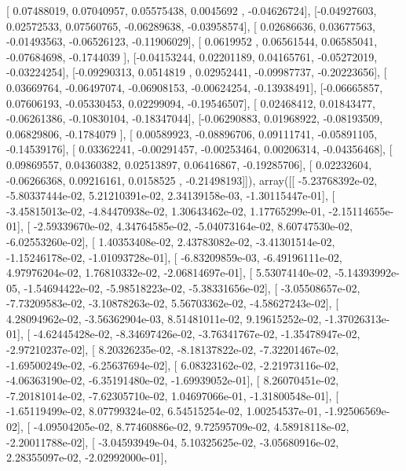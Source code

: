 \documentclass{article}
\begin{document}
       [ 0.07488019,  0.07040957,  0.05575438,  0.0045692 , -0.04626724],
       [-0.04927603,  0.02572533,  0.07560765, -0.06289638, -0.03958574],
       [ 0.02686636,  0.03677563, -0.01493563, -0.06526123, -0.11906029],
       [ 0.0619952 ,  0.06561544,  0.06585041, -0.07684698, -0.1744039 ],
       [-0.04153244,  0.02201189,  0.04165761, -0.05272019, -0.03224254],
       [-0.09290313,  0.0514819 ,  0.02952441, -0.09987737, -0.20223656],
       [ 0.03669764, -0.06497074, -0.06908153, -0.00624254, -0.13938491],
       [-0.06665857,  0.07606193, -0.05330453,  0.02299094, -0.19546507],
       [ 0.02468412,  0.01843477, -0.06261386, -0.10830104, -0.18347044],
       [-0.06290883,  0.01968922, -0.08193509,  0.06829806, -0.1784079 ],
       [ 0.00589923, -0.08896706,  0.09111741, -0.05891105, -0.14539176],
       [ 0.03362241, -0.00291457, -0.00253464,  0.00206314, -0.04356468],
       [ 0.09869557,  0.04360382,  0.02513897,  0.06416867, -0.19285706],
       [ 0.02232604, -0.06266368,  0.09216161,  0.0158525 , -0.21498193]]), array([[ -5.23768392e-02,  -5.80337444e-02,   5.21210391e-02,
          2.34139158e-03,  -1.30115447e-01],
       [ -3.45815013e-02,  -4.84470938e-02,   1.30643462e-02,
          1.17765299e-01,  -2.15114655e-01],
       [ -2.59339670e-02,   4.34764585e-02,  -5.04073164e-02,
          8.60747530e-02,  -6.02553260e-02],
       [  1.40353408e-02,   2.43783082e-02,  -3.41301514e-02,
         -1.15246178e-02,  -1.01093728e-01],
       [ -6.83209859e-03,  -6.49196111e-02,   4.97976204e-02,
          1.76810332e-02,  -2.06814697e-01],
       [  5.53074140e-02,  -5.14393992e-05,  -1.54694422e-02,
         -5.98518223e-02,  -5.38331656e-02],
       [ -3.05508657e-02,  -7.73209583e-02,  -3.10878263e-02,
          5.56703362e-02,  -4.58627243e-02],
       [  4.28094962e-02,  -3.56362904e-03,   8.51481011e-02,
          9.19615252e-02,  -1.37026313e-01],
       [ -4.62445428e-02,  -8.34697426e-02,  -3.76341767e-02,
         -1.35478947e-02,  -2.97210237e-02],
       [  8.20326235e-02,  -8.18137822e-02,  -7.32201467e-02,
         -1.69500249e-02,  -6.25637694e-02],
       [  6.08323162e-02,  -2.21973116e-02,  -4.06363190e-02,
         -6.35191480e-02,  -1.69939052e-01],
       [  8.26070451e-02,  -7.20181014e-02,  -7.62305710e-02,
          1.04697066e-01,  -1.31800548e-01],
       [ -1.65119499e-02,   8.07799324e-02,   6.54515254e-02,
          1.00254537e-01,  -1.92506569e-02],
       [ -4.09504205e-02,   8.77460886e-02,   9.72595709e-02,
          4.58918118e-02,  -2.20011788e-02],
       [ -3.04593949e-04,   5.10325625e-02,  -3.05680916e-02,
          2.28355097e-02,  -2.02992000e-01],
\end{document}
